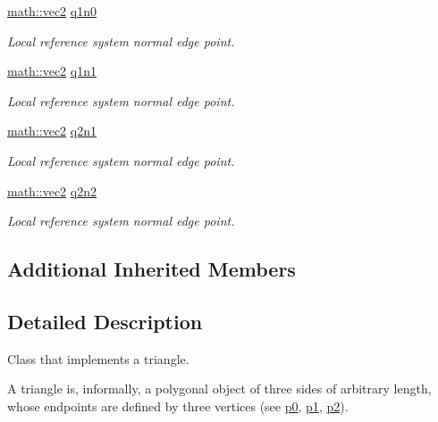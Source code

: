 \begin{DoxyCompactItemize}
\hyperlink{structphysim_1_1math_1_1vec2}{math\+::vec2} \hyperlink{classphysim_1_1geometric_1_1triangle_a63af9f8da24d783bbf074176bdfa8b19}{q1n0}
\begin{DoxyCompactList}\small\item\em Local reference system normal edge point. \end{DoxyCompactList}\item 
\hyperlink{structphysim_1_1math_1_1vec2}{math\+::vec2} \hyperlink{classphysim_1_1geometric_1_1triangle_ad9275f1b4a112b2ebb71276c784ca916}{q1n1}
\begin{DoxyCompactList}\small\item\em Local reference system normal edge point. \end{DoxyCompactList}\item 
\hyperlink{structphysim_1_1math_1_1vec2}{math\+::vec2} \hyperlink{classphysim_1_1geometric_1_1triangle_aeb73c7d7e511722fd5f338c6b32c06e3}{q2n1}
\begin{DoxyCompactList}\small\item\em Local reference system normal edge point. \end{DoxyCompactList}\item 
\hyperlink{structphysim_1_1math_1_1vec2}{math\+::vec2} \hyperlink{classphysim_1_1geometric_1_1triangle_ac88c73fe5cb3d6048d2324222489c9f6}{q2n2}
\begin{DoxyCompactList}\small\item\em Local reference system normal edge point. \end{DoxyCompactList}\end{DoxyCompactItemize}
\subsection*{Additional Inherited Members}


\subsection{Detailed Description}
Class that implements a triangle. 

A triangle is, informally, a polygonal object of three sides of arbitrary length, whose endpoints are defined by three vertices (see \hyperlink{classphysim_1_1geometric_1_1triangle_a83a74ead133513ca1d8f7c058b874b0b}{p0}, \hyperlink{classphysim_1_1geometric_1_1triangle_af274f6629feb02c8ae0b071c0343e6a2}{p1}, \hyperlink{classphysim_1_1geometric_1_1triangle_ae7ff2a7444cd30529e0a5a3801cc0112}{p2}).

